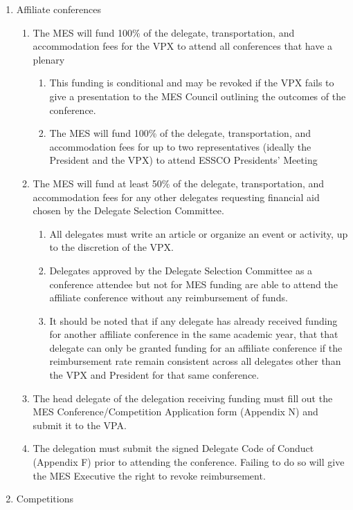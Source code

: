 \begin{enumerate}
 \item
  Affiliate conferences
  \begin{enumerate}
   \item
    The MES will fund 100\% of the delegate, transportation, and
    accommodation fees for the VPX to attend all conferences that have a
    plenary

    \begin{enumerate}
     \item
      This funding is conditional and may be revoked if the VPX fails to
      give a presentation to the MES Council outlining the outcomes of
      the conference.
     \item
      The MES will fund 100\% of the delegate, transportation, and
      accommodation fees for up to two representatives (ideally the
      President and the VPX) to attend ESSCO Presidents' Meeting
    \end{enumerate}
   \item
    The MES will fund at least 50\% of the delegate, transportation, and
    accommodation fees for any other delegates requesting financial aid
    chosen by the Delegate Selection Committee.

    \begin{enumerate}
     \item
      All delegates must write an article or organize an event or
      activity, up to the discretion of the VPX.
     \item
      Delegates approved by the Delegate Selection Committee as a
      conference attendee but not for MES funding are able to attend the
      affiliate conference without any reimbursement of funds.
     \item
      It should be noted that if any delegate has already received
      funding for another affiliate conference in the same academic
      year, that that delegate can only be granted funding for an
      affiliate conference if the reimbursement rate remain consistent
      across all delegates other than the VPX and President for that
      same conference.
    \end{enumerate}
   \item
    The head delegate of the delegation receiving funding must fill out
    the MES Conference/Competition Application form (Appendix N) and
    submit it to the VPA.
   \item
    The delegation must submit the signed Delegate Code of Conduct
    (Appendix F) prior to attending the conference. Failing to do so
    will give the MES Executive the right to revoke reimbursement.
  \end{enumerate}
 \item
  Competitions


\end{enumerate}
